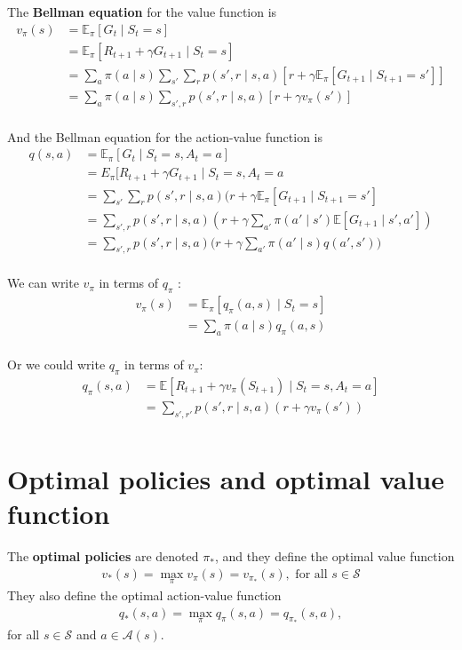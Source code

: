 \documentclass[a4paper,11pt,reqno]{amsart}
\begin{document}
The \textbf{Bellman equation} for the value function is
\begin{align}
v_\pi (s) &= \mathbb{E}_\pi \left[ G_t \mid S_t = s \right]  \\
&= \mathbb{E}_\pi \left[ R_{t + 1} + \gamma G_{t + 1} \mid S_t = s \right]  \\
&= \sum_{a} \pi (a \mid s) \sum_{s'} \sum_{r} p(s', r \mid s, a) \left[ r + \gamma \mathbb{E}_\pi \left[ G_{t + 1} \mid S_{t + 1} = s' \right]  \right]  \\
&= \sum_{a} \pi (a \mid s) \sum_{s', r} p(s', r \mid s, a) \left[ r + \gamma v_\pi (s') \right]  \\
\end{align}

And the Bellman equation for the action-value function is
\begin{align}
q(s, a) &= \mathbb{E}_\pi \left[ G_t \mid S_t =s, A_t = a \right]  \\
&= E_\pi [R_{t+1} + \gamma G_{t+1} \mid S_t = s, A_t = a \\
&= \sum_{s'} \sum_{r} p(s', r\mid s, a)(r + \gamma \mathbb{E}_\pi \left[ G_{t+1} \mid S_{t+1} = s' \right]  \\
&= \sum_{s', r}p(s', r \mid s, a)(r + \gamma \sum_{a'}\pi(a' \mid s') \mathbb{E}\left[ G_{t+1}\mid s', a' \right])   \\
&= \sum_{s', r}p(s', r \mid s, a)\Big(r + \gamma \sum_{a'} \pi (a'\mid s) q(a', s')\Big)  \\
\end{align}

We can write $v_\pi$ in terms of $q_\pi $ :
\begin{align}
    v_\pi(s) &= \mathbb{E}_\pi \left[ q_{\pi }(a, s) \mid S_t = s \right] \\
        &= \sum_{a} \pi (a\mid s) q_{\pi }(a,s) \\
\end{align}

Or we could write $q_\pi $ in terms of $v_\pi$:
\begin{align}
    q_\pi(s, a) &= \mathbb{E}\left[ R_{t+1} + \gamma v_\pi (S_{t+1}) \mid S_t = s, A_t = a \right] \\
        &= \sum_{s', r'} p(s', r \mid s, a)(r + \gamma v_\pi (s')) \\
\end{align}


\section*{Optimal policies and optimal value function}
The \textbf{optimal policies} are denoted $\pi _*$, and they define the optimal value function
\begin{align}
    v_{*}(s) = \max_\pi v_\pi (s) = v_{\pi_* }(s), \text{ for all }s \in \mathcal{S}
\end{align}
They also define the optimal action-value function
\begin{align}
    q_{*}(s, a) = \max_\pi q_\pi (s, a) = q_{\pi_* }(s, a),
\end{align}
for all $s \in \mathcal{S}$ and $a \in \mathcal{A}(s)$.
\end{document}

